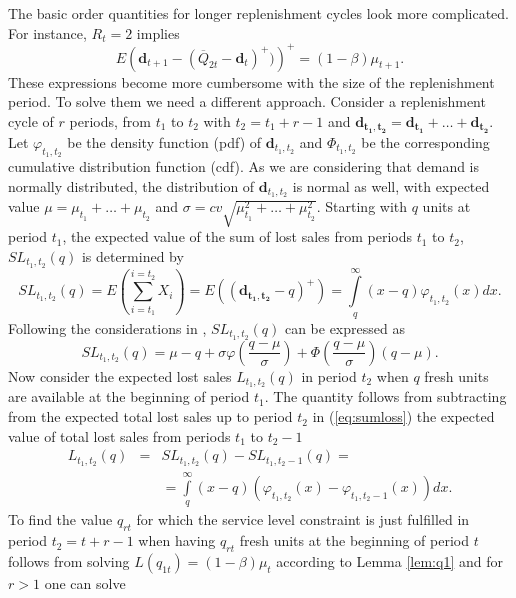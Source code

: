 The basic order quantities for longer replenishment cycles look more complicated. For instance, $R_t=2$ implies
$$E\left(\boldsymbol{d}_{t+1}-(\overline Q_{2t}-\boldsymbol{d}_{t})^+)\right)^+=(1-\beta)\mu_{t+1} .$$ 
%
These expressions become more cumbersome with the size of the replenishment period. To solve them we need a different approach.
%
Consider a replenishment cycle of $r$ periods, from $t_1$ to $t_2$ with $t_2=t_1+r-1$ and $\boldsymbol{d_{t_1,t_2}} = \boldsymbol {d_{t_1}} + \ldots + \boldsymbol {d_{t_2}}$.  Let $\varphi_{t_1,t_2}$ be the density function (pdf) of $\boldsymbol d_{t_1,t_2}$ and $\Phi_{t_1,t_2}$ be the corresponding cumulative distribution function (cdf). As we are considering that demand is normally distributed, the distribution of $\boldsymbol d_{t_1,t_2}$ is normal as well, with expected value $\mu=\mu_{t_1} + \ldots + \mu_{t_2}$ and $\sigma=cv \sqrt{\mu^2_{t_1} + \ldots+\mu^2_{t_2}}$. Starting with $q$ units at period $t_1$, the expected value of the sum of lost sales from periods $t_1$ to $t_2$, $SL_{t_1,t_2}(q)$ is determined by
\begin{equation}
\label{eq:sumloss}
SL_{t_1,t_2}(q)=E\left(\sum\limits_{i=t_1}^{i=t_2}X_i\right) =E\left((\boldsymbol{d_{t_1,t_2}}-q)^+\right)= \int\limits_{q}^{\infty} (x-q)\varphi_{t_1,t_2}(x)dx.
\end{equation}
Following the considerations in \cite{Rossi14}, $SL_{t_1,t_2}(q)$ can be expressed as
%
\begin{equation}
\label{eq:rossitotloss}
SL_{t_1,t_2}(q)=\mu-q+\sigma\varphi\left(\frac{q-\mu}{\sigma}\right)+\Phi\left(\frac{q-\mu}{\sigma}\right)(q-\mu).
 \end{equation}
Now consider the expected lost sales $L_{t_1,t_2}(q)$ in period $t_2$ when $q$ fresh units are available at the beginning of period $t_1$. The quantity follows from subtracting from the expected total lost sales up to period $t_2$ in (\ref{eq:sumloss}) the expected value of total lost sales from periods $t_1$ to $t_2 -1$
\begin{eqnarray}
\label{eq:lostsalesgeneral}
L_{t_1,t_2}(q)&=& SL_{t_1,t_2}(q)- SL_{t_1,t_2-1}(q) = \\ \nonumber
&&=\int\limits_{q}^{\infty} (x-q)\left(\varphi_{t_1,t_2}(x)-\varphi_{t_1,t_2-1}(x)\right)dx.
\end{eqnarray}
To find the value $q_{rt}$ for which the service level constraint is just fulfilled in period $t_2=t+r-1$ when having $q_{rt}$ fresh units at the beginning of period $t$ follows from solving $L(q_{1t})=(1-\beta)\mu_t$ according to Lemma \ref{lem:q1} and for $r>1$ one can solve
